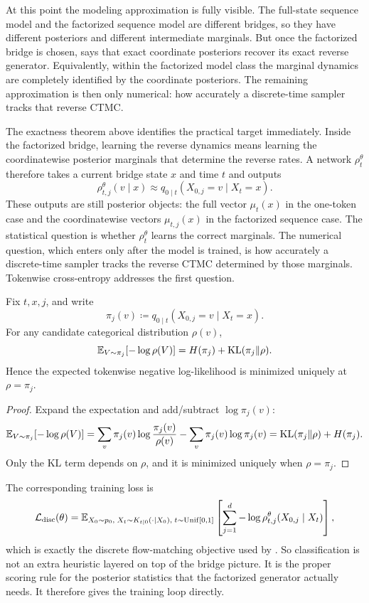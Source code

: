 \documentclass[11pt]{article}
\begin{document}
At this point the modeling approximation is fully visible.
The full-state sequence model and the factorized sequence model are different bridges, so they have different posteriors and different intermediate marginals.
But once the factorized bridge is chosen,  says that exact coordinate posteriors recover its exact reverse generator.
Equivalently, within the factorized model class the marginal dynamics are completely identified by the coordinate posteriors.
The remaining approximation is then only numerical: how accurately a discrete-time sampler tracks that reverse CTMC.

The exactness theorem above identifies the practical target immediately.
Inside the factorized bridge, learning the reverse dynamics means learning the coordinatewise posterior marginals that determine the reverse rates.
A network \(\rho_t^\theta\) therefore takes a current bridge state \(x\) and time \(t\) and outputs
\[
  \rho_{t,j}^\theta(v\mid x)
  \approx
  q_{0\mid t}(X_{0,j}=v\mid X_t=x).
\]
These outputs are still posterior objects: the full vector \(\mu_t(x)\) in the one-token case and the coordinatewise vectors \(\mu_{t,j}(x)\) in the factorized sequence case.
The statistical question is whether \(\rho_t^\theta\) learns the correct marginals.
The numerical question, which enters only after the model is trained, is how accurately a discrete-time sampler tracks the reverse CTMC determined by those marginals.
Tokenwise cross-entropy addresses the first question.

\begin{proposition}
\label{prop:cross-entropy-proper}
Fix \(t,x,j\), and write
\[
  \pi_j(v)\coloneqq q_{0\mid t}(X_{0,j}=v\mid X_t=x).
\]
For any candidate categorical distribution \(\rho(v)\),
\[
  \mathbb{E}_{V\sim \pi_j}[-\log \rho(V)]
  =
  H(\pi_j)+\operatorname{KL}(\pi_j\|\rho).
\]
Hence the expected tokenwise negative log-likelihood is minimized uniquely at \(\rho=\pi_j\).
\end{proposition}
\begin{proof}
Expand the expectation and add/subtract \(\log \pi_j(v)\):
\[
  \mathbb{E}_{V\sim \pi_j}[-\log \rho(V)]
  =
  \sum_v \pi_j(v)\log\frac{\pi_j(v)}{\rho(v)}
  -
  \sum_v \pi_j(v)\log \pi_j(v)
  =
  \operatorname{KL}(\pi_j\|\rho)+H(\pi_j).
\]
Only the KL term depends on \(\rho\), and it is minimized uniquely when \(\rho=\pi_j\).%
\end{proof}

The corresponding training loss is
\begin{equation}
  \mathcal{L}_{\mathrm{disc}}(\theta)
  =
  \mathbb{E}_{X_0\sim p_0,\; X_t\sim K_{t\mid 0}(\cdot\mid X_0),\; t\sim \mathrm{Unif}[0,1]}
  \left[
    \sum_{j=1}^d
    -\log \rho_{t,j}^\theta(X_{0,j}\mid X_t)
  \right],
  \label{eq:discrete-classification-loss}
\end{equation}
which is exactly the discrete flow-matching objective used by \citet[Eq.~(28) and Prop.~5]{gat2024discrete}.
So classification is not an extra heuristic layered on top of the bridge picture.
It is the proper scoring rule for the posterior statistics that the factorized generator actually needs.
It therefore gives the training loop directly.
\end{document}
